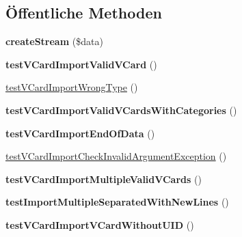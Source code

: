 \subsection*{Öffentliche Methoden}
\begin{DoxyCompactItemize}
\item 
\mbox{\label{class_sabre_1_1_v_object_1_1_splitter_1_1_v_card_test_ac2fd7caba5e153bd2435ba07cadd6ed1}} 
{\bfseries create\+Stream} (\$data)
\item 
\mbox{\label{class_sabre_1_1_v_object_1_1_splitter_1_1_v_card_test_ad87a2845941ac4819de63ba7fd1ad45d}} 
{\bfseries test\+V\+Card\+Import\+Valid\+V\+Card} ()
\item 
\mbox{\hyperlink{class_sabre_1_1_v_object_1_1_splitter_1_1_v_card_test_a25f2b62ff0821f9878dd1ef114002292}{test\+V\+Card\+Import\+Wrong\+Type}} ()
\item 
\mbox{\label{class_sabre_1_1_v_object_1_1_splitter_1_1_v_card_test_aa44e9c7b6f4a7deb529e40cba9bf7619}} 
{\bfseries test\+V\+Card\+Import\+Valid\+V\+Cards\+With\+Categories} ()
\item 
\mbox{\label{class_sabre_1_1_v_object_1_1_splitter_1_1_v_card_test_ac86de4ffd572680d3d83b190ba8585cb}} 
{\bfseries test\+V\+Card\+Import\+End\+Of\+Data} ()
\item 
\mbox{\hyperlink{class_sabre_1_1_v_object_1_1_splitter_1_1_v_card_test_a6b06e8871d99fb9a65b56eeca246ad1d}{test\+V\+Card\+Import\+Check\+Invalid\+Argument\+Exception}} ()
\item 
\mbox{\label{class_sabre_1_1_v_object_1_1_splitter_1_1_v_card_test_a6ff4102d56c26aca425acf0083a13814}} 
{\bfseries test\+V\+Card\+Import\+Multiple\+Valid\+V\+Cards} ()
\item 
\mbox{\label{class_sabre_1_1_v_object_1_1_splitter_1_1_v_card_test_a1fc20a6d4ba17ac896b380d9d580e115}} 
{\bfseries test\+Import\+Multiple\+Separated\+With\+New\+Lines} ()
\item 
\mbox{\label{class_sabre_1_1_v_object_1_1_splitter_1_1_v_card_test_aa623a004676ad81943d46cbca418efb3}} 
{\bfseries test\+V\+Card\+Import\+V\+Card\+Without\+U\+ID} ()
\end{DoxyCompactItemize}


